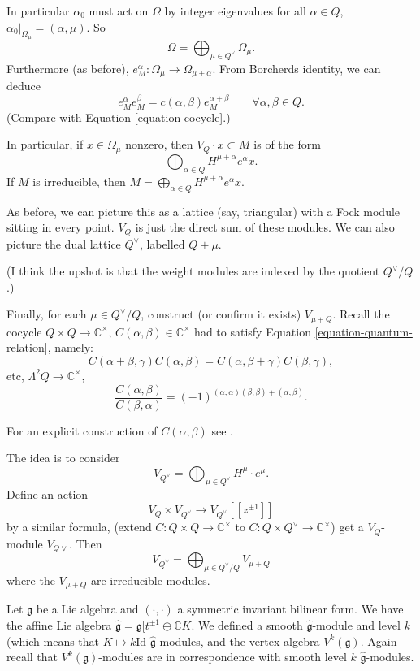In particular $\alpha_0$ must act on $\Omega$ by integer eigenvalues
for all $\alpha \in Q$, $\alpha_0|_{\Omega_\mu}=(\alpha,\mu)$.
So
 $$
\Omega=\bigoplus_{\mu \in Q^\vee} \Omega_\mu.
$$
Furthermore (as before),
$e_M^\alpha:\Omega_\mu \to \Omega_{\mu+\alpha}$.
From Borcherds identity, we can deduce
\begin{equation}
\label{equation-cocycle-m}
e^\alpha_M e^\beta_M=c(\alpha,\beta)e_M^{\alpha+\beta}\qquad 
\forall \alpha,\beta \in Q.
\end{equation}
(Compare with Equation \ref{equation-cocycle}.)

\noindent
In particular, if $x \in \Omega_\mu$ nonzero,
then $V_Q\cdot x \subset M$ is of the form
$$
\bigoplus_{\alpha \in Q}H^{\mu+\alpha}e^\alpha x.
$$
If $M$ is irreducible, then $M=
\bigoplus_{\alpha \in Q}H^{\mu+\alpha}e^\alpha x$.

As before, we can picture this as a lattice (say, triangular)
with a Fock module sitting in every point. $V_Q$ is just
the direct sum of these modules. We can also picture
the dual lattice $Q^\vee$, labelled $Q+\mu$.

(I think the upshot is that the weight modules
are indexed by the quotient $Q^\vee/Q$.)

\medskip\noindent
Finally, for each $\mu \in Q^\vee/Q$, construct
(or confirm it exists) $V_{\mu+Q}$.
Recall the cocycle $Q \times Q \to \mathbb{C}^\times$, 
$C(\alpha,\beta) \in \mathbb{C}^\times$
had to satisfy Equation \ref{equation-quantum-relation}, namely:
 $$
C(\alpha+\beta,\gamma)C(\alpha,\beta)
=C(\alpha,\beta+\gamma)C(\beta,\gamma),
$$
etc, $\Lambda^2Q \to \mathbb{C}^\times$,
$$
\frac{C(\alpha,\beta)}{C(\beta,\alpha)}
=(-1)^{(\alpha,\alpha)(\beta,\beta)+(\alpha,\beta)}.
$$

For an explicit construction of $C(\alpha,\beta)$ see
\cite[Section 5]{KVAB}.

\medskip\noindent
The idea is to consider
$$
V_{Q^\vee}=\bigoplus_{\mu \in Q^\vee}H^\mu\cdot e^\mu.
$$
Define an action
 $$
V_Q \times V_{Q^\vee} \to V_{Q^\vee}[[z^{\pm 1}]]
$$
by a similar formula,
(extend $C:Q \times Q \to \mathbb{C}^\times$ 
to $C:Q\times Q^\vee \to \mathbb{C}^\times$)
get a $V_Q$-module $V_{Q\vee}$.
Then
$$
V_{Q^\vee}=\bigoplus_{\mu \in Q^\vee/Q}V_{\mu+Q}
$$
where the $V_{\mu+Q}$ are irreducible modules.




\medskip\noindent
\noindent
Let $\mathfrak{g}$ be a Lie algebra and
$(\cdot,\cdot)$ a symmetric invariant bilinear form.
We have the affine Lie algebra 
$\hat{\mathfrak{g}}=\mathfrak{g}[t^{\pm 1}\oplus \mathbb{C}K$.
We defined a smooth $\hat{\mathfrak{g}}$-module
and level $k$ (which means that $K \mapsto  k \text{Id}$
$\hat{\mathfrak{g}}$-modules,
and the vertex algebra $V^k(\mathfrak{g})$.
Again recall that $V^k(\mathfrak{g})$-modules
are in correspondence with smooth level $k$ $\hat{\mathfrak{g}}$-modules.


